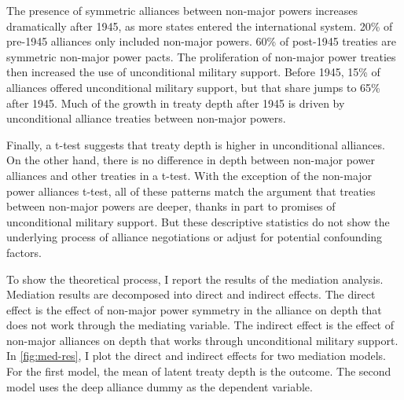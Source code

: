 \documentclass[12pt]{article}
\begin{document}
The presence of symmetric alliances between non-major powers increases dramatically after 1945, as more states entered the international system. 
20\% of pre-1945 alliances only included non-major powers. 
60\% of post-1945 treaties are symmetric non-major power pacts. 
The proliferation of non-major power treaties then increased the use of unconditional military support. 
Before 1945, 15\% of alliances offered unconditional military support, but that share jumps to 65\% after 1945. 
Much of the growth in treaty depth after 1945 is driven by unconditional alliance treaties between non-major powers. 


Finally, a t-test suggests that treaty depth is higher in unconditional alliances. 
On the other hand, there is no difference in depth between non-major power alliances and other treaties in a t-test. 
With the exception of the non-major power alliances t-test, all of these patterns match the argument that treaties between non-major powers are deeper, thanks in part to promises of unconditional military support. 
But these descriptive statistics do not show the underlying process of alliance negotiations or adjust for potential confounding factors. 


To show the theoretical process, I report the results of the mediation analysis. 
Mediation results are decomposed into direct and indirect effects. 
The direct effect is the effect of non-major power symmetry in the alliance on depth that does not work through the mediating variable. 
The indirect effect is the effect of non-major alliances on depth that works through unconditional military support. 
In \autoref{fig:med-res}, I plot the direct and indirect effects for two mediation models. 
For the first model, the mean of latent treaty depth is the outcome. 
The second model uses the deep alliance dummy as the dependent variable. 
\end{document}

